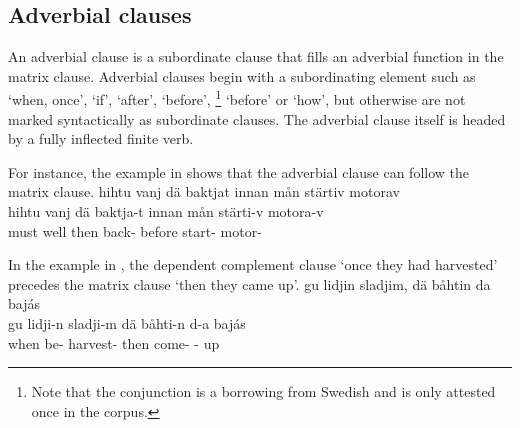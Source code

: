 \subsection{Adverbial clauses}\label{adverbialClauses}
An adverbial clause is a subordinate clause that fills an adverbial function in the matrix clause. %
Adverbial clauses begin with a subordinating element such as  ‘when, once’,  ‘if’,  ‘after’,  ‘before’, \footnote{Note that the conjunction  is a borrowing from Swedish and is only attested once in the corpus.} ‘before’ %
or  ‘how’, %
but otherwise are not marked syntactically as subordinate clauses. The adverbial clause itself is headed by a fully inflected finite verb.%

For instance, the example in  shows that the adverbial clause can follow the matrix clause.%
\ea\label{adverbialClause1}%
\glll	hihtu vanj dä baktjat innan mån stärtiv motorav\\
	hihtu vanj dä baktja-t innan mån stärti-v motora-v\\
	must\BS{} well then back- before  start- motor-\\\nopagebreak
{} 
\z

In the example in , the dependent complement clause  ‘once they had harvested’ precedes the matrix clause  ‘then they came up’. %
\ea\label{adverbialClause2}%
\glll	gu lidjin sladjim, dä båhtin da bajás\\
	gu lidji-n sladji-m dä båhti-n d-a bajás\\
	when be- harvest- then come- -\BS{} up\\\nopagebreak
{} 
\z



